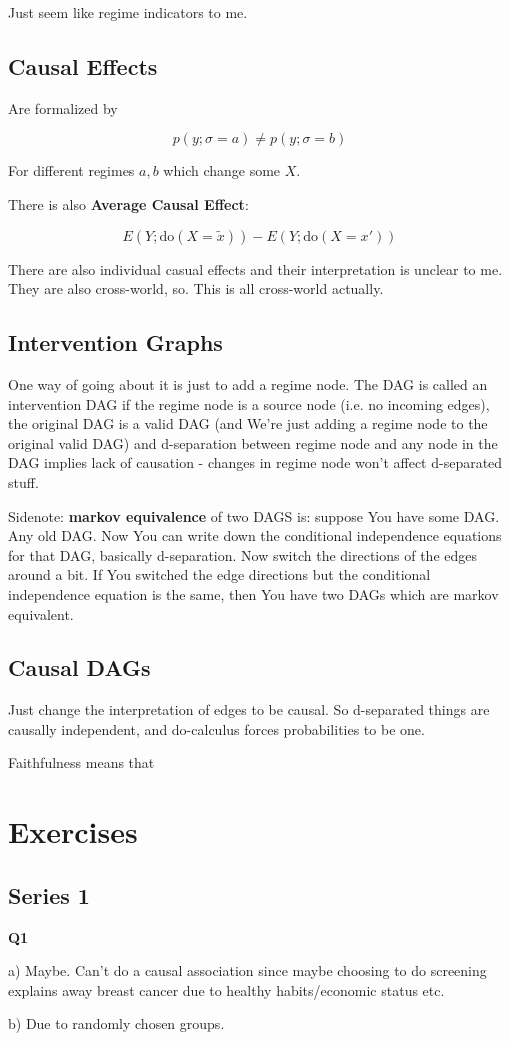 \documentclass{article}
\begin{document}
			Just seem like regime indicators to me. 
			
		\subsection{Causal Effects}
		
			Are formalized by
			
			\[ p(y;\sigma= a) \neq p(y;\sigma = b) \]
		 
		 	For different regimes $a, b$ which change some $X$. 
		 	
		 	There is also \textbf{Average Causal Effect}:
		 	
			\[ E(Y;\text{do}(X = \tilde{x})) - E(Y;\text{do}(X = x')) \]
		 
		 	There are also individual casual effects and their interpretation is unclear to me. They are also cross-world, so. This is all cross-world actually.
		 	
		\subsection{Intervention Graphs}
		
			One way of going about it is just to add a regime node. The DAG is called an intervention DAG if the regime node is a source node (i.e. no incoming edges), the original DAG is a valid DAG (and We're just adding a regime node to the original valid DAG) and d-separation between regime node and any node in the DAG implies lack of causation - changes in regime node won't affect d-separated stuff. 
			
			Sidenote: \textbf{markov equivalence} of two DAGS is: suppose You have some DAG. Any old DAG. Now You can write down the conditional independence equations for that DAG, basically d-separation. Now switch the directions of the edges around a bit. If You switched the edge directions but the conditional independence equation is the same, then You have two DAGs which are markov equivalent.
			
		\subsection{Causal DAGs}
		
			Just change the interpretation of edges to be causal. So d-separated things are causally independent, and do-calculus forces probabilities to be one. 
			
			Faithfulness means that 
		 
		 
		 
		 
\newpage
\section{Exercises}
	
	\subsection{Series 1}
	
		\textbf{Q1}
		
			a) Maybe. Can't do a causal association since maybe choosing to do screening explains away breast cancer due to healthy habits/economic status etc.
			
			b) Due to randomly chosen groups. 
	
\end{document}
